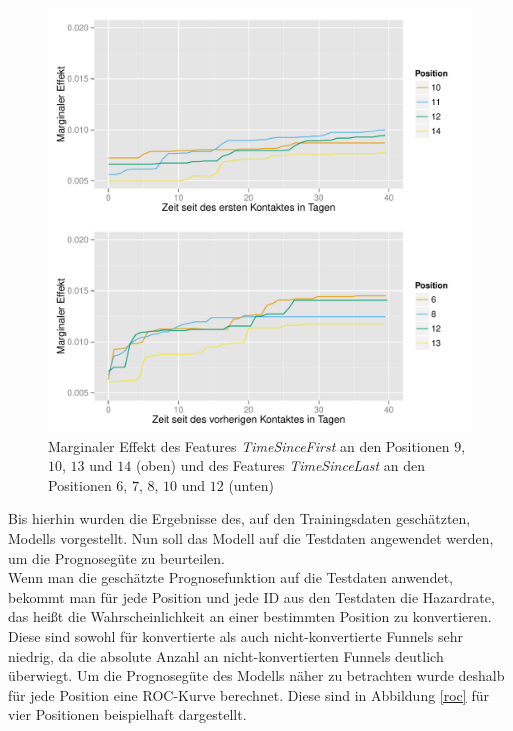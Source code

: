 \begin{figure}[H]
	\centering\includegraphics[scale=0.75]{marg_eff_time.pdf}\caption{Marginaler Effekt des Features \textit{TimeSinceFirst} an den Positionen $9$, $10$, $13$ und $14$ (oben) und des Features \textit{TimeSinceLast} an den Positionen $6$, $7$, $8$, $10$ und $12$ (unten)}\label{marg_eff_time}
\end{figure}
Bis hierhin wurden die Ergebnisse des, auf den Trainingsdaten geschätzten, Modells vorgestellt. Nun soll das Modell auf die Testdaten angewendet werden, um die Prognosegüte zu beurteilen.\\
Wenn man die geschätzte Prognosefunktion auf die Testdaten anwendet, bekommt man für jede Position und jede ID aus den Testdaten die Hazardrate, das heißt die Wahrscheinlichkeit an einer bestimmten Position zu konvertieren. Diese sind sowohl für konvertierte als auch nicht-konvertierte Funnels sehr niedrig, da die absolute Anzahl an nicht-konvertierten Funnels deutlich überwiegt. Um die Prognosegüte des Modells näher zu betrachten wurde deshalb für jede Position eine ROC-Kurve berechnet. Diese sind in Abbildung \ref{roc} für vier Positionen beispielhaft dargestellt.\\
